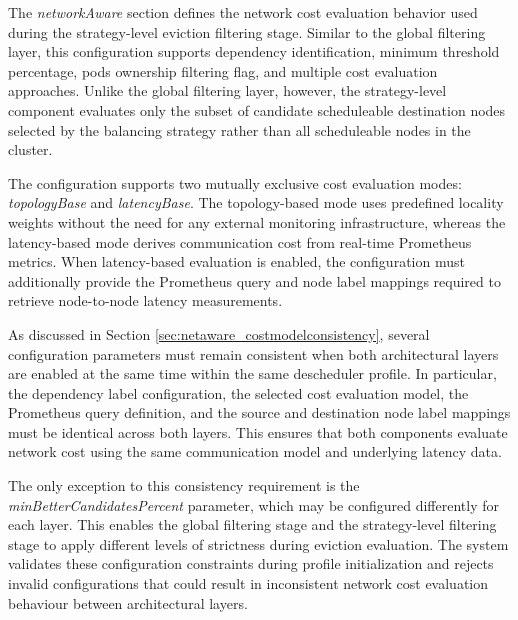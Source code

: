 The \textit{networkAware} section defines the network cost evaluation behavior used during the strategy-level eviction filtering stage. Similar to the global filtering layer, this configuration supports dependency identification, minimum threshold percentage, pods ownership filtering flag, and multiple cost evaluation approaches. Unlike the global filtering layer, however, the strategy-level component evaluates only the subset of candidate scheduleable destination nodes selected by the balancing strategy rather than all scheduleable nodes in the cluster.

The configuration supports two mutually exclusive cost evaluation modes: \textit{topologyBase} and \textit{latencyBase}. The topology-based mode uses predefined locality weights without the need for any external monitoring infrastructure, whereas the latency-based mode derives communication cost from real-time Prometheus metrics. When latency-based evaluation is enabled, the configuration must additionally provide the Prometheus query and node label mappings required to retrieve node-to-node latency measurements.

As discussed in Section \ref{sec:netaware_costmodelconsistency}, several configuration parameters must remain consistent when both architectural layers are enabled at the same time within the same descheduler profile. In particular, the dependency label configuration, the selected cost evaluation model, the Prometheus query definition, and the source and destination node label mappings must be identical across both layers. This ensures that both components evaluate network cost using the same communication model and underlying latency data.

The only exception to this consistency requirement is the \textit{minBetterCandidatesPercent} parameter, which may be configured differently for each layer. This enables the global filtering stage and the strategy-level filtering stage to apply different levels of strictness during eviction evaluation. The system validates these configuration constraints during profile initialization and rejects invalid configurations that could result in inconsistent network cost evaluation behaviour between architectural layers.
